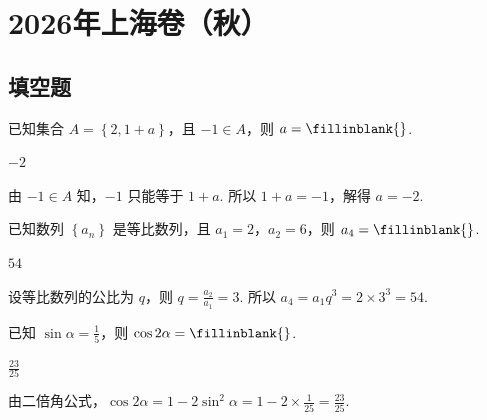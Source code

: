 \documentclass[UTF8,a4paper,oneside,11pt]{ctexbook}
\begin{document}
\mainmatter

\chapter{2026年上海卷（秋）}

\section{填空题}

\begin{problem}
已知集合 \( A=\left\{ 2,1+a \right\} \)，且 \( -1\in A \)，则 \( a=\fillinblank{} \).
\end{problem}

\begin{answer}
\(-2\)
\end{answer}

\begin{solution}
由 \( -1\in A \) 知，\( -1 \) 只能等于 \( 1+a \). 所以 \( 1+a=-1 \)，解得 \( a=-2 \).
\end{solution}

\begin{problem}
已知数列 \( \left\{ a_n \right\} \) 是等比数列，且 \( a_1=2 \)，\( a_2=6 \)，则 \( a_4=\fillinblank{} \).
\end{problem}

\begin{answer}
\(54\)
\end{answer}

\begin{solution}
设等比数列的公比为 \( q \)，则 \( q=\frac{a_2}{a_1}=3 \). 所以 \( a_4=a_1 q^3=2\times 3^3=54 \).
\end{solution}

\begin{problem}
已知 \( \sin \alpha=\frac{1}{5} \)，则 \( \cos 2\alpha=\fillinblank{} \).
\end{problem}

\begin{answer}
\(\frac{23}{25}\)
\end{answer}

\begin{solution}
由二倍角公式，\( \cos 2\alpha=1-2\sin^2\alpha=1-2\times \frac{1}{25}=\frac{23}{25} \).
\end{solution}
\end{document}
